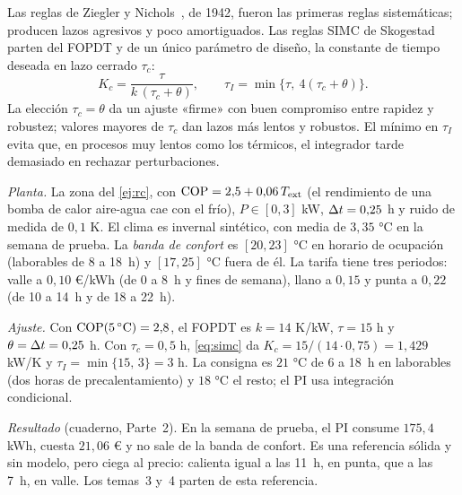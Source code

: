 Las reglas de Ziegler y Nichols~\cite{zn}, de 1942, fueron las primeras reglas sistemáticas; producen lazos agresivos y poco amortiguados. Las reglas SIMC de Skogestad~\cite{skogestad} parten del FOPDT y de un único parámetro de diseño, la constante de tiempo deseada en lazo cerrado $\tau_c$:
\begin{equation}\label{eq:simc}
K_c=\frac{\tau}{k\,(\tau_c+\theta)},\qquad \tau_I=\min\bigl\{\tau,\ 4(\tau_c+\theta)\bigr\}.
\end{equation}
La elección $\tau_c=\theta$ da un ajuste «firme» con buen compromiso entre rapidez y robustez; valores mayores de $\tau_c$ dan lazos más lentos y robustos. El mínimo en $\tau_I$ evita que, en procesos muy lentos como los térmicos, el integrador tarde demasiado en rechazar perturbaciones.

\begin{ejemplo}\label{ej:caso-pi}
\emph{Planta.} La zona del \cref{ej:rc}, con $\mathrm{COP}=2{,}5+0{,}06\,T_{\mathrm{ext}}$ (el rendimiento de una bomba de calor aire-agua cae con el frío), $P\in[0,3]$ kW, $\Delta t=0{,}25$ h y ruido de medida de $0{,}1$ K. El clima es invernal sintético, con media de $3{,}35$ °C en la semana de prueba. La \emph{banda de confort} es $[20,23]$ °C en horario de ocupación (laborables de 8 a 18~h) y $[17,25]$ °C fuera de él. La tarifa tiene tres periodos: valle a $0{,}10$ €/kWh (de 0 a 8~h y fines de semana), llano a $0{,}15$ y punta a $0{,}22$ (de 10 a 14~h y de 18 a 22~h).

\emph{Ajuste.} Con $\mathrm{COP}(5\,^\circ\mathrm C)=2{,}8$, el FOPDT es $k=14$ K/kW, $\tau=15$ h y $\theta=\Delta t=0{,}25$ h. Con $\tau_c=0{,}5$ h, \eqref{eq:simc} da $K_c=15/(14\cdot 0{,}75)=1{,}429$ kW/K y $\tau_I=\min\{15,\,3\}=3$ h. La consigna es $21$ °C de 6 a 18~h en laborables (dos horas de precalentamiento) y $18$ °C el resto; el PI usa integración condicional.

\emph{Resultado} (cuaderno, Parte~2). En la semana de prueba, el PI consume $175{,}4$ kWh, cuesta $21{,}06$ € y no sale de la banda de confort. Es una referencia sólida y sin modelo, pero ciega al precio: calienta igual a las 11~h, en punta, que a las 7~h, en valle. Los temas~3 y~4 parten de esta referencia.
\end{ejemplo}

